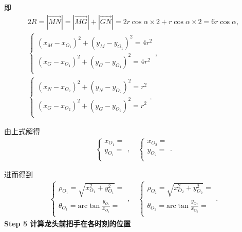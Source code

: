 \documentclass{cumcmthesis}
\begin{document}
\par 即
\begin{gather}
    2R=\left| \overrightarrow{MN} \right|=\left| \overrightarrow{MG} \right|+\left| \overrightarrow{GN} \right|= 2r\cos\alpha\times2 + r\cos\alpha\times2 = 6r\cos\alpha,
    \\
    \begin{cases}\label{1.........50}
    \left( x_M-x_{O_1} \right) ^2+\left( y_M-y_{O_1} \right) ^2=4r^2\\
    \left( x_G-x_{O_1} \right) ^2+\left( y_G-y_{O_1} \right) ^2=4r^2\\
    \end{cases},
    \\
    \begin{cases}\label{1.........51}
    \left( x_N-x_{O_2} \right) ^2+\left( y_N-y_{O_2} \right) ^2=r^2\\
    \left( x_G-x_{O_2} \right) ^2+\left( y_G-y_{O_2} \right) ^2=r^2\\
    \end{cases}.
    \end{gather}
        \par 由上式解得
        \begin{gather}\label{1.........52}
        \begin{cases}
        x_{O_1}=\\
        y_{O_1}=\\
        \end{cases},\quad \begin{cases}
        x_{O_2}=\\
        y_{O_2}=\\
        \end{cases}.
    \end{gather}
   \par  进而得到
    \begin{gather}\label{1.........53}
    \begin{cases}
    \rho _{O_1}=\sqrt{x_{O_1}^{2}+y_{O_1}^{2}}=\\
    \theta _{O_1}=\mathrm{arc}\tan \frac{y_{O_1}}{x_{O_1}}=\\
    \end{cases},\quad \begin{cases}
    \rho _{O_2}=\sqrt{x_{O_2}^{2}+y_{O_2}^{2}}=\\
    \theta _{O_2}=\mathrm{arc}\tan \frac{y_{O_2}}{x_{O_2}}=\\
    \end{cases}.
    \end{gather}
    \noindent\textbf{Step 5 计算龙头前把手在各时刻的位置} 
    
\end{document}
